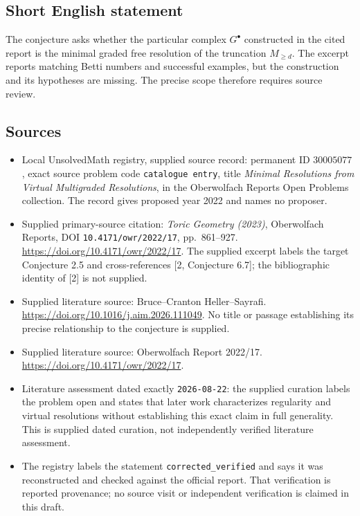 \documentclass[11pt]{article}
\begin{document}
\subsection{Short English statement}
The conjecture asks whether the particular complex \(G^\bullet\) constructed in the cited report is the minimal graded free resolution of the truncation \(M_{\geq d}\). The excerpt reports matching Betti numbers and successful examples, but the construction and its hypotheses are missing. The precise scope therefore requires source review.
\subsection{Sources}
\begin{itemize}
\item Local UnsolvedMath registry, supplied source record: permanent ID \(30005077\), exact source problem code \texttt{catalogue entry}, title \emph{Minimal Resolutions from Virtual Multigraded Resolutions}, in the Oberwolfach Reports Open Problems collection. The record gives proposed year 2022 and names no proposer.
\item Supplied primary-source citation: \emph{Toric Geometry (2023)}, Oberwolfach Reports, DOI \texttt{10.4171/owr/2022/17}, pp.\ 861--927. \url{https://doi.org/10.4171/owr/2022/17}. The supplied excerpt labels the target Conjecture 2.5 and cross-references [2, Conjecture 6.7]; the bibliographic identity of [2] is not supplied.
\item Supplied literature source: Bruce--Cranton Heller--Sayrafi. \url{https://doi.org/10.1016/j.aim.2026.111049}. No title or passage establishing its precise relationship to the conjecture is supplied.
\item Supplied literature source: Oberwolfach Report 2022/17. \url{https://doi.org/10.4171/owr/2022/17}.
\item Literature assessment dated exactly \texttt{2026-08-22}: the supplied curation labels the problem open and states that later work characterizes regularity and virtual resolutions without establishing this exact claim in full generality. This is supplied dated curation, not independently verified literature assessment.
\item The registry labels the statement \texttt{corrected\_verified} and says it was reconstructed and checked against the official report. That verification is reported provenance; no source visit or independent verification is claimed in this draft.
\end{itemize}
\end{document}
